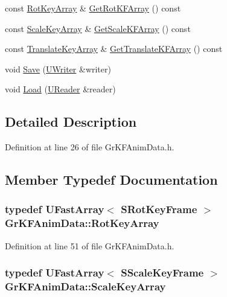 \begin{CompactItemize}
\item 
const \hyperlink{class_u_fast_array}{RotKeyArray} \& \hyperlink{class_gr_k_f_anim_data_47c324fefce09f6f44417a363beefd1f}{GetRotKFArray} () const 
\item 
const \hyperlink{class_u_fast_array}{ScaleKeyArray} \& \hyperlink{class_gr_k_f_anim_data_3e3baf34cc6fc43210abf023922249fd}{GetScaleKFArray} () const 
\item 
const \hyperlink{class_u_fast_array}{TranslateKeyArray} \& \hyperlink{class_gr_k_f_anim_data_12bc47bbcae2a4b2f6c1e2752f5892fc}{GetTranslateKFArray} () const 
\item 
void \hyperlink{class_gr_k_f_anim_data_daa2dfc535b931dfcbeb52fcf0630d8c}{Save} (\hyperlink{class_u_writer}{UWriter} \&writer)
\item 
void \hyperlink{class_gr_k_f_anim_data_1cf48bc46744b33fc701998b77f71ead}{Load} (\hyperlink{class_u_reader}{UReader} \&reader)
\end{CompactItemize}


\subsection{Detailed Description}


Definition at line 26 of file GrKFAnimData.h.

\subsection{Member Typedef Documentation}
\hypertarget{class_gr_k_f_anim_data_3ec7db018331bb9a3d0b8ced4f22859a}{
\subsubsection[{RotKeyArray}]{\setlength{\rightskip}{0pt plus 5cm}typedef {\bf UFastArray}$<$ {\bf SRotKeyFrame} $>$ {\bf GrKFAnimData::RotKeyArray}}}
\label{class_gr_k_f_anim_data_3ec7db018331bb9a3d0b8ced4f22859a}




Definition at line 51 of file GrKFAnimData.h.\hypertarget{class_gr_k_f_anim_data_60223633a25292285068192bd20f71dc}{
\subsubsection[{ScaleKeyArray}]{\setlength{\rightskip}{0pt plus 5cm}typedef {\bf UFastArray}$<$ {\bf SScaleKeyFrame} $>$ {\bf GrKFAnimData::ScaleKeyArray}}}
\label{class_gr_k_f_anim_data_60223633a25292285068192bd20f71dc}




